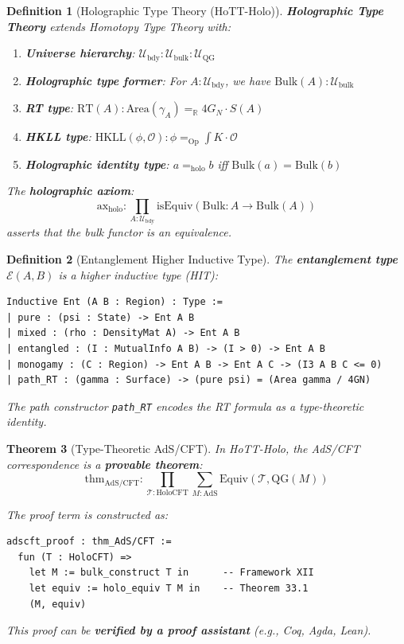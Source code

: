 \documentclass[12pt,a4paper]{article}
\newtheorem{theorem}{Theorem}[section]
\newtheorem{definition}[theorem]{Definition}
\begin{document}
\begin{definition}[Holographic Type Theory (HoTT-Holo)]\label{def:hott-holo}
\textbf{Holographic Type Theory} extends Homotopy Type Theory with:
\begin{enumerate}
    \item \textbf{Universe hierarchy}: $\mathcal{U}_{\text{bdy}} : \mathcal{U}_{\text{bulk}} : \mathcal{U}_{\text{QG}}$
    \item \textbf{Holographic type former}: For $A : \mathcal{U}_{\text{bdy}}$, we have $\text{Bulk}(A) : \mathcal{U}_{\text{bulk}}$
    \item \textbf{RT type}: $\text{RT}(A) : \text{Area}(\gamma_A) =_{\mathbb{R}} 4G_N \cdot S(A)$
    \item \textbf{HKLL type}: $\text{HKLL}(\phi, \mathcal{O}) : \phi =_{\text{Op}} \int K \cdot \mathcal{O}$
    \item \textbf{Holographic identity type}: $a =_{\text{holo}} b$ iff $\text{Bulk}(a) = \text{Bulk}(b)$
\end{enumerate}

The \textbf{holographic axiom}:
\begin{equation}
\text{ax}_{\text{holo}} : \prod_{A : \mathcal{U}_{\text{bdy}}} \text{isEquiv}(\text{Bulk} : A \to \text{Bulk}(A))
\end{equation}
asserts that the bulk functor is an equivalence.
\end{definition}

\begin{definition}[Entanglement Higher Inductive Type]\label{def:ent-hit}
The \textbf{entanglement type} $\mathcal{E}(A, B)$ is a higher inductive type (HIT):
\begin{verbatim}
Inductive Ent (A B : Region) : Type :=
| pure : (psi : State) -> Ent A B
| mixed : (rho : DensityMat A) -> Ent A B  
| entangled : (I : MutualInfo A B) -> (I > 0) -> Ent A B
| monogamy : (C : Region) -> Ent A B -> Ent A C -> (I3 A B C <= 0)
| path_RT : (gamma : Surface) -> (pure psi) = (Area gamma / 4GN)
\end{verbatim}

The path constructor \texttt{path\_RT} encodes the RT formula as a type-theoretic identity.
\end{definition}

\begin{theorem}[Type-Theoretic AdS/CFT]\label{thm:type-adscft}
In HoTT-Holo, the AdS/CFT correspondence is a \textbf{provable theorem}:
\begin{equation}
\text{thm}_{\text{AdS/CFT}} : \prod_{\mathcal{T} : \text{HoloCFT}} \sum_{M : \text{AdS}} \text{Equiv}(\mathcal{T}, \text{QG}(M))
\end{equation}

The proof term is constructed as:
\begin{verbatim}
adscft_proof : thm_AdS/CFT :=
  fun (T : HoloCFT) =>
    let M := bulk_construct T in      -- Framework XII
    let equiv := holo_equiv T M in    -- Theorem 33.1
    (M, equiv)
\end{verbatim}

This proof can be \textbf{verified by a proof assistant} (e.g., Coq, Agda, Lean).
\end{theorem}
\end{document}
